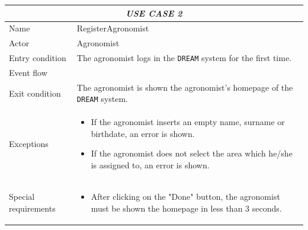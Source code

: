 \documentclass{article}
\begin{document}
\centering
\begin{longtable}{|p{3.5cm}|m{8cm}|}
 \hline
 \multicolumn{2}{|c|}{\cellcolor{white}\emph{USE CASE 2}} \\
 \endfirsthead
 \endhead
 \endfoot
 \endlastfoot
 \hline
 Name & RegisterAgronomist\\
 \hline
 Actor & Agronomist\\
 \hline
 Entry condition & The agronomist logs in the \verb|DREAM| system for the first time.\\
 \hline
 Event flow & \begin{enumerate}
    
 \end{enumerate}\\
 \hline
 Exit condition & The agronomist is shown the agronomist's homepage of the \verb|DREAM| system.\\
 \hline
 Exceptions & \begin{itemize}
     \item If the agronomist inserts an empty name, surname or birthdate, an error is shown.
     \item If the agronomist does not select the area which he/she is assigned to, an error is shown.
 \end{itemize}\\
 \hline
 Special requirements & \begin{itemize}
     \item After clicking on the "Done" button, the agronomist must be shown the homepage in less than 3 seconds.
 \end{itemize}\\
 \hline
\end{longtable}
\end{document}
